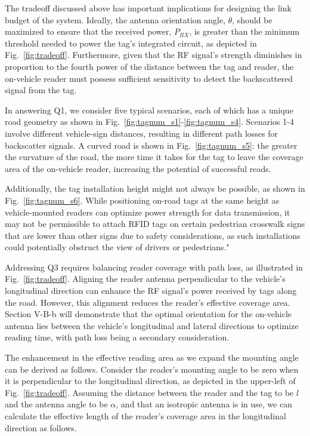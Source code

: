 \documentclass[lettersize,journal]{IEEEtran}
\begin{document}
The tradeoff discussed above has important implications for designing the link budget of the system. Ideally, the antenna orientation angle, $\theta$, should be maximized to ensure that the received power, $P_{RX}$, is greater than the minimum threshold needed to power the tag's integrated circuit, as depicted in Fig.~\ref{fig:tradeoff}. Furthermore, given that the RF signal's strength diminishes in proportion to the fourth power of the distance between the tag and reader, the on-vehicle reader must possess sufficient sensitivity to detect the backscattered signal from the tag.

In answering Q1, we consider five typical scenarios, each of which has a unique road geometry as shown in  Fig.~\ref{fig:tagnum_s1}-\ref{fig:tagnum_s4}. Scenarios 1-4 involve different vehicle-sign distances, resulting in different path losses for backscatter signals. A curved road is shown in Fig.~\ref{fig:tagnum_s5}: the greater the curvature of the road, the more time it takes for the tag to leave the coverage area of the on-vehicle reader, increasing the potential of successful reads.

Additionally, the tag installation height might not always be possible, as shown in Fig.~\ref{fig:tagnum_s6}. While positioning on-road tags at the same height as vehicle-mounted readers can optimize power strength for data transmission, it may not be permissible to attach RFID tags on certain pedestrian crosswalk signs that are lower than other signs due to safety considerations, as such installations could potentially obstruct the view of drivers or pedestrians."


Addressing Q3 requires balancing reader coverage with path loss, as illustrated in Fig.~\ref{fig:tradeoff}. Aligning the reader antenna perpendicular to the vehicle’s longitudinal direction can enhance the RF signal's power received by tags along the road. However, this alignment reduces the reader's effective coverage area. Section V-B-b will demonstrate that the optimal orientation for the on-vehicle antenna lies between the vehicle's longitudinal and lateral directions to optimize reading time, with path loss being a secondary consideration. 

The enhancement in the effective reading area as we expand the mounting angle can be derived as follows. Consider the reader's mounting angle to be zero when it is perpendicular to the longitudinal direction, as depicted in the upper-left of Fig.~\ref{fig:tradeoff}. Assuming the distance between the reader and the tag to be $l$ and the antenna angle to be $\alpha$, and that an isotropic antenna is in use, we can calculate the effective length of the reader's coverage area in the longitudinal direction as follows.
\end{document}
